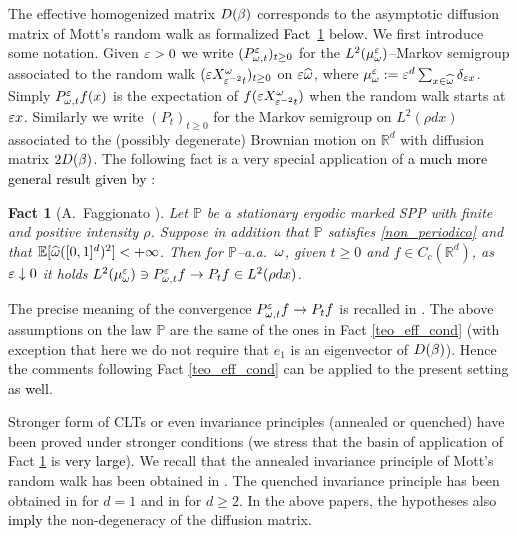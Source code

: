 \documentclass[12pt,a4paper,reqno]{amsart}
\newtheorem{Fact}[Theorem]{Fact}
\newcommand{\bbE}{{\ensuremath{\mathbb E}} }
\newcommand{\bbL}{{\ensuremath{\mathbb L}} }
\newcommand{\bbP}{{\ensuremath{\mathbb P}} }
\newcommand{\bbR}{{\ensuremath{\mathbb R}} }
\newcommand{\rosso}{\textcolor{black}} %
\newcommand{\orc}{\textcolor{black}} %
\newcommand{\da}{\downarrow}
\begin{document}
The effective homogenized matrix $D(\beta)$ corresponds to the asymptotic diffusion matrix of Mott's random walk as formalized \rosso{Fact~\ref{tolmezzo}} below. We first introduce some notation.
 Given $\varepsilon>0$ we write $(P^\varepsilon _{\omega ,t} )_{t \geq 0}$ for the $L^2(\mu^\varepsilon _\omega)$--Markov semigroup associated to the random walk $(\varepsilon X^\omega _{ \varepsilon^{-2} t} )_{t\geq 0}$ on $\varepsilon \widehat {\omega}$, where $\mu^\varepsilon_\omega := \varepsilon^d \sum _{x\in \widehat {\omega}} \delta_{\varepsilon x}$. Simply $P^\varepsilon _{\omega ,t}f(x)$ is the expectation of $f ( \varepsilon X^\omega _{ \varepsilon^{-2} t})$ when the random walk starts at $\varepsilon x$.
  Similarly we write $( P_t  )_{t \geq 0} $ for the  Markov semigroup on $L^2( \rho dx)$ associated to the  (possibly degenerate)  Brownian motion on $\bbR^d$  with diffusion matrix $2 D(\beta)$. 
 The following fact is   a  very special application of \orc{a much more general result given by  \cite[Theorem~4.4]{Fhom1}}:
 \begin{Fact}[A.~Faggionato \cite{Fhom1}] \label{tolmezzo}
 Let $\bbP$ be a stationary ergodic marked SPP  with finite and positive intensity $\rho$. Suppose in addition that $\bbP$ satisfies \eqref{non_periodico}
and that 
 $ \bbE[ \widehat{\o} ([0,1]^d)^2 ]  <+\infty$. Then for $\bbP$--a.a.~$\omega$, given   $t\geq 0$  and $f\in C_c(\bbR^d)$, as $\e\da 0$  it holds
$ L^2(\mu^\varepsilon _\omega ) \ni P^\varepsilon_{\omega,t} f \to P_t f \in L^2(\rho dx)$.
 \end{Fact}
 The precise  meaning of the   convergence $ P^\varepsilon_{\omega,t} f \to P_t f$  is recalled in \cite[Section~3.5]{Fhom1}.
 The above assumptions on the law $\bbP$ are the same of the ones in   Fact \ref{teo_eff_cond} (with exception that here we do not require that $e_1$ is an eigenvector of $D(\beta)$). Hence the comments following  Fact \ref{teo_eff_cond} can be applied to the present setting \rosso{as well}.
 
 Stronger form of CLTs or even  invariance principles (annealed or quenched) have been proved under stronger conditions (we stress that the basin of application of Fact \ref{tolmezzo} is \rosso{very large}). 
 We recall that the annealed invariance principle of Mott's random walk has been obtained in \cite{FSS}. The quenched invariance principle has been obtained in \cite{CF1} for $d=1$ and in \cite{CFP} for $d\geq 2$. In the above papers, the hypotheses also \rosso{imply} the non-degeneracy of the diffusion matrix. 
 
\end{document}
